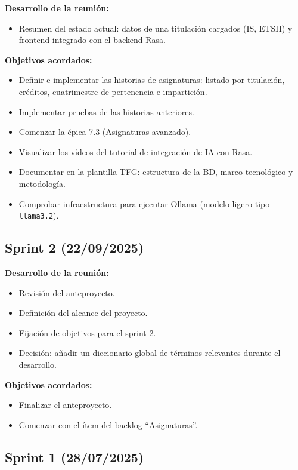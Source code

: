 \textbf{Desarrollo de la reunión:}
\begin{itemize}
  \item Resumen del estado actual: datos de una titulación cargados (IS, ETSII) y frontend integrado con el backend Rasa.
\end{itemize}

\textbf{Objetivos acordados:}
\begin{itemize}
  \item Definir e implementar las historias de asignaturas: listado por titulación, créditos, cuatrimestre de pertenencia e impartición.
  \item Implementar pruebas de las historias anteriores.
  \item Comenzar la épica 7.3 (Asignaturas avanzado).
  \item Visualizar los vídeos del tutorial de integración de IA con Rasa.
  \item Documentar en la plantilla TFG: estructura de la BD, marco tecnológico y metodología.
  \item Comprobar infraestructura para ejecutar Ollama (modelo ligero tipo \texttt{llama3.2}).
\end{itemize}

\subsection*{Sprint 2 (22/09/2025)}

\textbf{Desarrollo de la reunión:}
\begin{itemize}
  \item Revisión del anteproyecto.
  \item Definición del alcance del proyecto.
  \item Fijación de objetivos para el sprint 2.
  \item Decisión: añadir un diccionario global de términos relevantes durante el desarrollo.
\end{itemize}

\textbf{Objetivos acordados:}
\begin{itemize}
  \item Finalizar el anteproyecto.
  \item Comenzar con el ítem del backlog ``Asignaturas''.
\end{itemize}

\subsection*{Sprint 1 (28/07/2025)}

